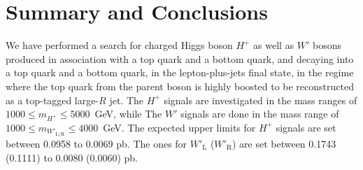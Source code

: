 \section{Summary and Conclusions}
\label{sec:Summary}

We have performed a search for charged Higgs boson $H^{+}$ as well as $W'$ bosons produced in association with a top quark and a bottom quark, and decaying into a top quark and a bottom quark, in the lepton-plus-jets final state, in the regime where the top quark from the parent boson is highly boosted to be reconstructed as a top-tagged large-$R$ jet. The $H^{+}$ signals are investigated in the mass ranges of $1000 \leq m_{H^{+}} \leq 5000$~GeV, while The $W'$ signals are done in the mass range of $1000 \leq m_{W'_{\text{L/R}}} \leq 4000$~GeV. The expected upper limits for $H^{+}$ signals are set between 0.0958 to 0.0069 pb. The ones for $W'_{\text{L}}$ ($W'_{\text{R}}$) are set between 0.1743 (0.1111) to 0.0080 (0.0060) pb.